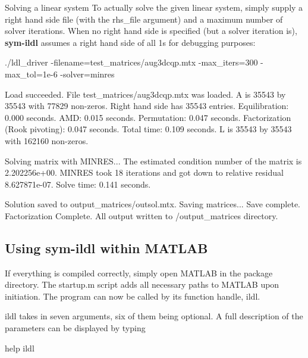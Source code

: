 \begin{DoxyParagraph}{Solving a linear system}
To actually solve the given linear system, simply supply a right hand side file (with the {\ttfamily rhs\+\_\+file} argument) and a maximum number of solver iterations. When no right hand side is specified (but a solver iteration is), {\bfseries sym-\/ildl} assumes a right hand side of all 1\textquotesingle{}s for debugging purposes\+: 
\begin{DoxyCode}
./ldl\_driver -filename=test\_matrices/aug3dcqp.mtx -max\_iters=300 -max\_tol=1e-6 -solver=minres

Load succeeded. File test\_matrices/aug3dcqp.mtx was loaded.
A is 35543 by 35543 with 77829 non-zeros.
Right hand side has 35543 entries.
  Equilibration:                       0.000 seconds.
  AMD:                                  0.015 seconds.
  Permutation:                          0.047 seconds.
  Factorization (Rook pivoting):        0.047 seconds.
Total time:     0.109 seconds.
L is 35543 by 35543 with 162160 non-zeros.

Solving matrix with MINRES...
The estimated condition number of the matrix is 2.202256e+00.
MINRES took 18 iterations and got down to relative residual 8.627871e-07.
Solve time:             0.141 seconds.

Solution saved to output\_matrices/outsol.mtx.
Saving matrices...
Save complete.
Factorization Complete. All output written to /output\_matrices directory.
\end{DoxyCode}

\end{DoxyParagraph}
\hypertarget{index_matlab_mex}{}\subsection{Using sym-\/ildl within M\+A\+T\+L\+AB}\label{index_matlab_mex}
If everything is compiled correctly, simply open M\+A\+T\+L\+AB in the package directory. The {\ttfamily startup.\+m} script adds all necessary paths to M\+A\+T\+L\+AB upon initiation. The program can now be called by its function handle, {\ttfamily ildl}.

{\ttfamily ildl} takes in seven arguments, six of them being optional. A full description of the parameters can be displayed by typing 
\begin{DoxyCode}
help ildl
\end{DoxyCode}



